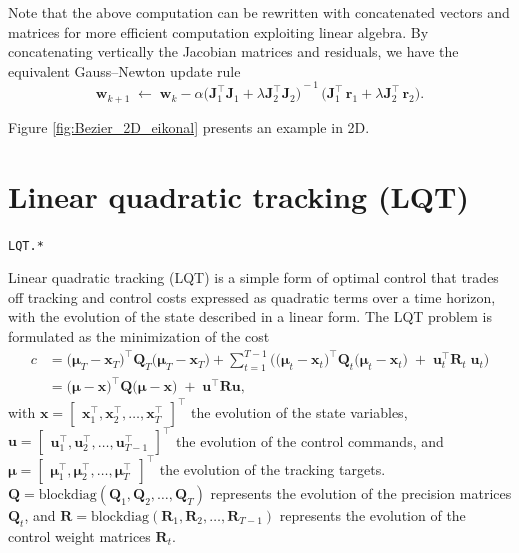 \documentclass[10pt,a4paper]{article} %
\newcommand{\trsp}{{\scriptscriptstyle\top}}
\newcommand{\filename}[1]{\colorbox{rr2}{\color{white}\texttt{#1}}}
\begin{document}
Note that the above computation can be rewritten with concatenated vectors and matrices for more efficient computation exploiting linear algebra. By concatenating vertically the Jacobian matrices and residuals, we have the equivalent Gauss--Newton update rule
\begin{equation*}
	\bm{w}_{k+1} \;\leftarrow\; 
	\bm{w}_k - \alpha {\Bigg( \bm{J}_{1}^\trsp \bm{J}_{1} + \lambda \bm{J}_{2}^\trsp \bm{J}_{2} \Bigg)}^{\!-1} \, 
	\Bigg( \bm{J}_{1}^\trsp \, \bm{r}_{1} + \lambda \bm{J}_{2}^\trsp \, \bm{r}_{2} \bigg).
\end{equation*}

Figure \ref{fig:Bezier_2D_eikonal} presents an example in 2D.


\section{Linear quadratic tracking (LQT)}\label{sec:LQT}
\begin{flushright}
\filename{LQT.*}
\end{flushright}

Linear quadratic tracking (LQT) is a simple form of optimal control that trades off tracking and control costs expressed as quadratic terms over a time horizon, with the evolution of the state described in a linear form. The LQT problem is formulated as the minimization of the cost
\begin{align}
	c
	&= {\big(\bm{\mu}_T\!-\!\bm{x}_T\big)}^\trsp
	\bm{Q}_T 
	\big(\bm{\mu}_T\!-\!\bm{x}_T\big) +
	\sum_{t=1}^{T-1} \Big({\big(\bm{\mu}_t\!-\!\bm{x}_t\big)}^\trsp
	\bm{Q}_t  
	\big(\bm{\mu}_t\!-\!\bm{x}_t\big) 
	\;+\;
	\bm{u}_t^\trsp \bm{R}_t\; \bm{u}_t \Big)
	\nonumber\\
	&= {\big(\bm{\mu}-\bm{x}\big)}^\trsp
	\bm{Q} 
	\big(\bm{\mu}-\bm{x}\big)
	\;+\;
	\bm{u}^\trsp \!\bm{R} \bm{u} ,
	\label{eq:cBatch}
\end{align}
with $\bm{x}\!=\!{\begin{bmatrix}\bm{x}_1^\trsp, \bm{x}_2^\trsp, \ldots, \bm{x}_T^\trsp \end{bmatrix}}^\trsp$ the evolution of the state variables, 
$\bm{u}\!=\!{\begin{bmatrix}\bm{u}_1^\trsp, \bm{u}_2^\trsp, \ldots, \bm{u}_{T-1}^\trsp \end{bmatrix}}^\trsp$ the evolution of the control commands, and 
$\bm{\mu}\!=\!{\begin{bmatrix}\bm{\mu}_1^\trsp, \bm{\mu}_2^\trsp, \ldots, \bm{\mu}_T^\trsp \end{bmatrix}}^\trsp$ the evolution of the tracking targets.
$\bm{Q}\!=\!\mathrm{blockdiag}(\bm{Q}_1,\bm{Q}_2,\ldots,\bm{Q}_T)$ represents the evolution of the precision matrices $\bm{Q}_t$, and 
$\bm{R}\!=\!\mathrm{blockdiag}(\bm{R}_{1},\bm{R}_{2},\ldots,\bm{R}_{T-1})$ represents the evolution of the control weight matrices $\bm{R}_t$. 
\end{document}
